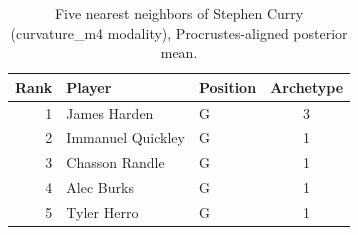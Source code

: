 \begin{table}[htbp]
  \centering\small
  \begin{tabular}{rllc}
    \toprule
    Rank & Player & Position & Archetype \\
    \midrule
    1 & James Harden & G & 3 \\
    2 & Immanuel Quickley & G & 1 \\
    3 & Chasson Randle & G & 1 \\
    4 & Alec Burks & G & 1 \\
    5 & Tyler Herro & G & 1 \\
    \bottomrule
  \end{tabular}
  \caption{Five nearest neighbors of Stephen Curry (curvature_m4 modality), Procrustes-aligned posterior mean.}
  \label{tab:Stephen_Curry_neighbors_curvature_m4}
\end{table}

